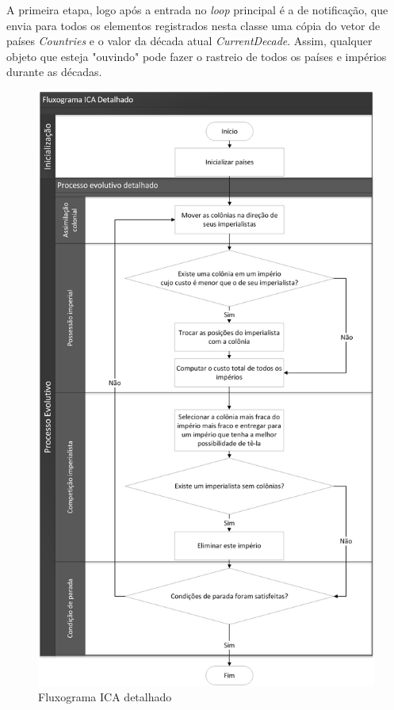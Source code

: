 A primeira etapa, logo após a entrada no \emph{loop} principal é a de notificação, que envia para todos os elementos registrados nesta classe uma cópia do vetor de países \emph{Countries} e o valor da década atual \emph{CurrentDecade}. Assim, qualquer objeto que esteja "ouvindo" pode fazer o rastreio de todos os países e impérios durante as décadas.

 \begin{figure}[h]
	\centering	
	\includegraphics[scale=0.5]{Figuras/Fluxograms-ICACanocicDetailed.png}
	\caption{Fluxograma ICA detalhado}
	\label{fig:Fluxograms-ICACanocicDetailed}
	\end{figure}
	
